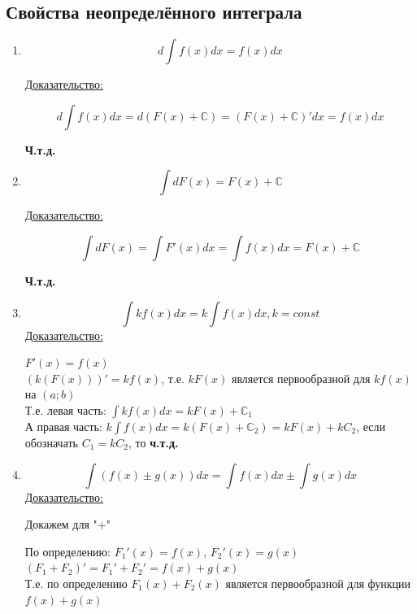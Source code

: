 \documentclass[12pt]{article}
\begin{document}
    \subsection{Свойства неопределённого интеграла}
    \begin{enumerate}
        \item \[ d \int f(x) dx = f(x)dx \]
        \begin{center}
            \underline{Доказательство:}
        \end{center}
        \[ d \int f(x)dx = d(F(x) + \mathbb{C}) = (F(x) + \mathbb{C})'dx = f(x)dx \]
        \begin{center}
            \textbf{Ч.т.д.}
        \end{center}
        \item \[ \int dF(x) = F(x) + \mathbb{C} \]
        \begin{center}
            \underline{Доказательство:}
        \end{center}
        \[ \int dF(x) = \int F'(x)dx = \int f(x)dx = F(x) + \mathbb{C} \]
        \begin{center}
            \textbf{Ч.т.д.}
        \end{center}
        \item \[ \int k f(x) dx = k \int f(x) dx, k = const \]
        \underline{Доказательство:}
        \begin{adjustwidth}{1.5em}{1.5em}
            $F'(x) = f(x)$\\
            $(k(F(x)))' = kf(x)$, т.е. $kF(x)$ является первообразной для $kf(x)$ на $(a; b)$\\
            Т.е. левая часть: $\int kf(x)dx = kF(x) + \mathbb{C}_1$\\
            А правая часть: $k \int f(x)dx = k(F(x) + \mathbb{C}_2) = kF(x) + kC_2$, если обозначать $C_1 = kC_2$, то \textbf{ч.т.д.}
        \end{adjustwidth}
        \item \[ \int (f(x) \pm g(x)) dx = \int f(x) dx \pm \int g(x)dx \]
        \underline{Доказательство:}
        \begin{adjustwidth}{1.5em}{1.5em}
            Докажем для "+"\par\noindent
            По определению: $F_1'(x) = f(x)$, $F_2'(x) = g(x)$\\
            $(F_1 + F_2)' = F_1' + F_2' = f(x) + g(x)$\\
            Т.е. по определению $F_1(x) + F_2(x)$ является первообразной для функции $f(x) + g(x)$\\

\end{adjustwidth}
\end{enumerate}
\end{document}
